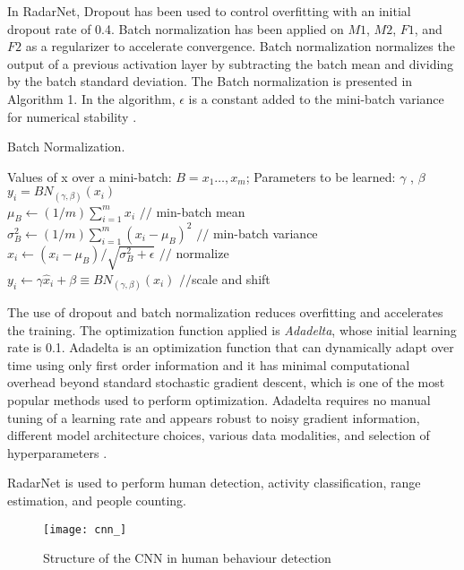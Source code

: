 In RadarNet, Dropout has been used to control overfitting with an initial dropout rate of 0.4. Batch normalization \cite{ioffe2015batch} has been applied on $M1$, $M2$, $F1$, and $F2$ as a regularizer to accelerate convergence. Batch normalization normalizes the output of a previous activation layer by subtracting the batch mean and dividing by the batch standard deviation. The Batch normalization is presented in Algorithm 1. In the algorithm, $\epsilon$ is a constant added to the mini-batch variance for numerical stability \cite{ioffe2015batch}.
\begin{algorithm}
 \caption{ Batch Normalization\cite{ioffe2015batch}.}  
  \label{alg:bn}  
\begin{algorithmic}[1]  
    \Require  
      Values of x over a mini-batch: $B={x_1…,x_m}$;
            Parameters to be learned: $\gamma$ , $\beta$  
    \Ensure   ${y_i=BN_{(\gamma,\beta)} (x_i)}$  
    \newline
    \\$\mu _B\leftarrow (1/m)\sum_{i=1}^{m}x_i$ \qquad $//$ min-batch mean 
 \newline
    \\$\sigma ^2 _B\leftarrow (1/m)\sum_{i=1}^{m}(x_i-\mu _B)^2$ \qquad $//$ min-batch variance
    \newline
    \\$\hat{x}_i\leftarrow (x_i-\mu _B)/\sqrt{\sigma ^2 _B+\epsilon }$ \qquad  $//$ normalize
    \newline
    \\$y_i\leftarrow \gamma \hat{x}_i+\beta \equiv BN_{(\gamma,\beta)} (x_i)$ \qquad $//$scale and shift

  \end{algorithmic}  
\end{algorithm}


The use of dropout and batch normalization reduces overfitting and accelerates the training. The optimization function applied is \textit{Adadelta}, whose initial learning rate is 0.1. Adadelta is an optimization function that can dynamically adapt over time using only first order information and it has minimal computational overhead beyond standard stochastic gradient descent, which is one of the most popular methods used to perform optimization. Adadelta requires no manual tuning of a learning rate and appears robust to noisy gradient information, different model architecture choices, various data modalities, and selection of hyperparameters \cite{zeiler2012adadelta}. 

RadarNet is used to perform human detection, activity classification, range estimation, and people counting. 
\begin{figure}[!t]
\centering
\texttt{[image: cnn\_]}
\caption{Structure of the CNN in human behaviour detection}
\label{fig_cnn_}
\end{figure}

